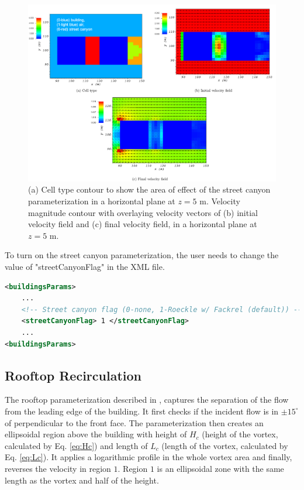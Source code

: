 \begin{figure}[H]
    \centering
    \includegraphics[width=\textwidth]{Images/street_z_5_1.pdf}
    \caption{(a) Cell type contour to show the area of effect of the street canyon parameterization in a horizontal plane at $z=5$ m. Velocity magnitude contour with overlaying velocity vectors of (b) initial velocity field and (c) final velocity field, in a horizontal plane at $z=5$ m.}
\end{figure}

To turn on the street canyon parameterization, the user needs to change the value of "streetCanyonFlag" in the XML file.

\begin{lstlisting}[language=XML]
<buildingsParams>
	...
	<!-- Street canyon flag (0-none, 1-Roeckle w/ Fackrel (default)) -->
	<streetCanyonFlag> 1 </streetCanyonFlag> 	
	... 				
<buildingsParams>
\end{lstlisting}

\subsection{Rooftop Recirculation}

The rooftop parameterization described in \cite{bagal2004implementation,pol2006implementation}, captures the separation of the flow from the leading edge of the building. It first checks if the incident flow is in $\pm15^{\circ}$ of perpendicular to the front face. The parameterization then creates an ellipsoidal region above the building with height of $H_c$ (height of the vortex, calculated by Eq. \ref{eq:Hc}) and length of $L_c$ (length of the vortex, calculated by Eq. \ref{eq:Lc}). It applies a logarithmic profile in the whole vortex area and finally, reverses the velocity in region $1$. Region $1$ is an ellipsoidal zone with the same length as the vortex and half of the height.

